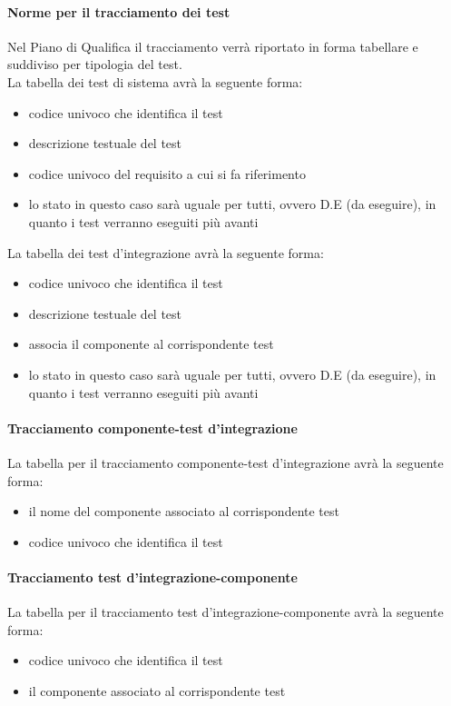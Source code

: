 \paragraph{Norme per il tracciamento dei test \\}
Nel Piano di Qualifica il tracciamento verrà riportato in forma tabellare e suddiviso per tipologia del test.\\
La tabella dei test di sistema avrà la seguente forma:
\begin{itemize}
\item {}codice univoco che identifica il test
\item {} descrizione testuale del test
\item {}codice univoco del requisito a cui si fa riferimento
\item {}lo stato in questo caso sarà uguale per tutti, ovvero D.E (da eseguire), in quanto i test verranno eseguiti più avanti
\end{itemize}
La tabella dei test d'integrazione avrà la seguente forma:
\begin{itemize}
\item {}codice univoco che identifica il test
\item {} descrizione testuale del test
\item {} associa il componente al corrispondente test
\item {}lo stato in questo caso sarà uguale per tutti, ovvero D.E (da eseguire), in quanto i test verranno eseguiti più avanti
\end{itemize}

\paragraph{Tracciamento componente-test d'integrazione \\}
La tabella per il tracciamento componente-test d'integrazione avrà la seguente forma:
\begin{itemize}
\item {} il nome del componente associato al corrispondente test
\item {}codice univoco che identifica il test
\end{itemize}

\paragraph{Tracciamento test d'integrazione-componente \\}
La tabella per il tracciamento test d'integrazione-componente avrà la seguente forma:
\begin{itemize}
\item {}codice univoco che identifica il test
\item {} il componente associato al corrispondente test
\end{itemize}


